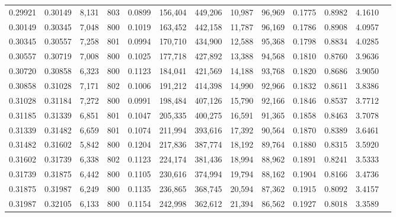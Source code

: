 \begin{tabular}{rrrrrrrrrrrrr}
0.29921 & 0.30149 &  8,131 & 803 &                                     0.0899 & 156,404 & 449,206 &  10,987 &  96,969 & 0.1775 & 0.8982 & 4.1610 \\
0.30149 & 0.30345 &  7,048 & 800 &                                     0.1019 & 163,452 & 442,158 &  11,787 &  96,169 & 0.1786 & 0.8908 & 4.0957 \\
0.30345 & 0.30557 &  7,258 & 801 &                                     0.0994 & 170,710 & 434,900 &  12,588 &  95,368 & 0.1798 & 0.8834 & 4.0285 \\
0.30557 & 0.30719 &  7,008 & 800 &                                     0.1025 & 177,718 & 427,892 &  13,388 &  94,568 & 0.1810 & 0.8760 & 3.9636 \\
0.30720 & 0.30858 &  6,323 & 800 &                                     0.1123 & 184,041 & 421,569 &  14,188 &  93,768 & 0.1820 & 0.8686 & 3.9050 \\
0.30858 & 0.31028 &  7,171 & 802 &                                     0.1006 & 191,212 & 414,398 &  14,990 &  92,966 & 0.1832 & 0.8611 & 3.8386 \\
0.31028 & 0.31184 &  7,272 & 800 &                                     0.0991 & 198,484 & 407,126 &  15,790 &  92,166 & 0.1846 & 0.8537 & 3.7712 \\
0.31185 & 0.31339 &  6,851 & 801 &                                     0.1047 & 205,335 & 400,275 &  16,591 &  91,365 & 0.1858 & 0.8463 & 3.7078 \\
0.31339 & 0.31482 &  6,659 & 801 &                                     0.1074 & 211,994 & 393,616 &  17,392 &  90,564 & 0.1870 & 0.8389 & 3.6461 \\
0.31482 & 0.31602 &  5,842 & 800 &                                     0.1204 & 217,836 & 387,774 &  18,192 &  89,764 & 0.1880 & 0.8315 & 3.5920 \\
0.31602 & 0.31739 &  6,338 & 802 &                                     0.1123 & 224,174 & 381,436 &  18,994 &  88,962 & 0.1891 & 0.8241 & 3.5333 \\
0.31739 & 0.31875 &  6,442 & 800 &                                     0.1105 & 230,616 & 374,994 &  19,794 &  88,162 & 0.1904 & 0.8166 & 3.4736 \\
0.31875 & 0.31987 &  6,249 & 800 &                                     0.1135 & 236,865 & 368,745 &  20,594 &  87,362 & 0.1915 & 0.8092 & 3.4157 \\
0.31987 & 0.32105 &  6,133 & 800 &                                     0.1154 & 242,998 & 362,612 &  21,394 &  86,562 & 0.1927 & 0.8018 & 3.3589 \\

\end{tabular}
